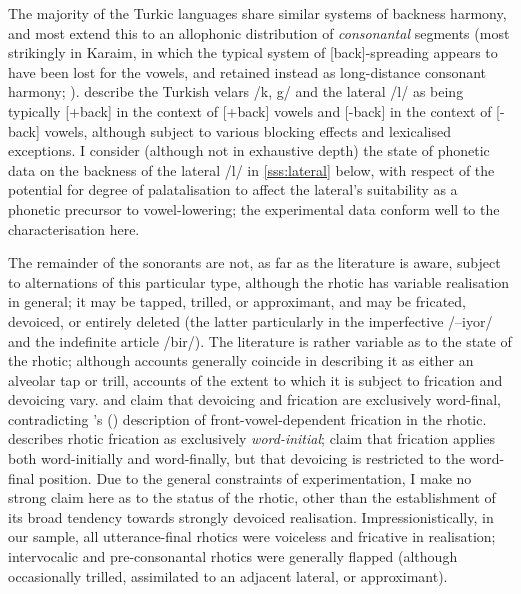 The majority of the Turkic languages share similar systems of backness harmony, and most extend this to an allophonic distribution of \emph{consonantal} segments (most strikingly in Karaim, in which the typical system of [back]-spreading appears to have been lost for the vowels, and retained instead as long-distance consonant harmony; \citealt{Nevins2003}). \cite{Clements1982} describe the Turkish velars /k, g/ and the lateral /l/ as being typically [+back] in the context of [+back] vowels and [-back] in the context of [-back] vowels, although subject to various blocking effects and lexicalised exceptions. I consider (although not in exhaustive depth) the state of phonetic data on the backness of the lateral /l/ in \cref{sss:lateral} below, with respect of the potential for degree of palatalisation to affect the lateral's suitability as a phonetic precursor to vowel-lowering; the experimental data conform well to the characterisation here.

The remainder of the sonorants are not, as far as the literature is aware, subject to alternations of this particular type, although the rhotic has variable realisation in general; it may be tapped, trilled, or approximant, and may be fricated, devoiced, or entirely deleted (the latter particularly in the imperfective /–iyor/ and the indefinite article /bir/). The literature is rather variable as to the state of the rhotic; although accounts generally coincide \citep{Lewis1967,Goksel2005} in describing it as either an alveolar tap or trill, accounts of the extent to which it is subject to frication and devoicing vary. \citet[p.~7]{Lewis1967} and \citet[p.~29]{Kopkalli1993} claim that devoicing and frication are exclusively word-final, contradicting \citeauthor{Blaskovics1964}'s (\citeyear[p.~5–10]{Blaskovics1964}) description of front-vowel-dependent frication in the rhotic. \cite{Comrie1997Tr} describes rhotic frication as exclusively \emph{word-initial}; \citet[p.~25]{Yavuz2011} claim that frication applies both word-initially and word-finally, but that devoicing is restricted to the word-final position. Due to the general constraints of experimentation, I make no strong claim here as to the status of the rhotic, other than the establishment of its broad tendency towards strongly devoiced realisation. Impressionistically, in our sample, all utterance-final rhotics were voiceless and fricative in realisation; intervocalic and pre-consonantal rhotics were generally flapped (although occasionally trilled, assimilated to an adjacent lateral, or approximant).


